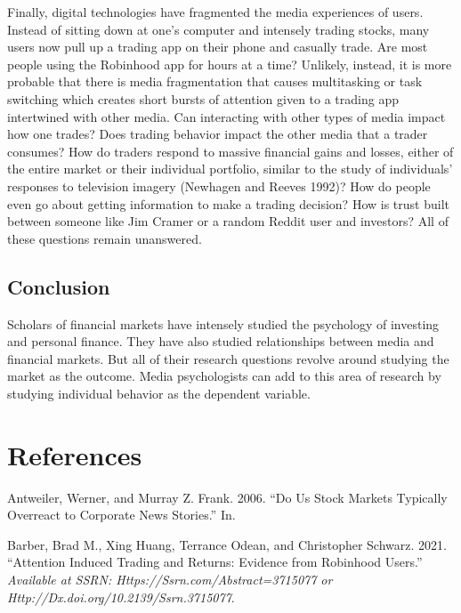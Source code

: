 \documentclass[12pt,]{article}
\begin{document}
Finally, digital technologies have fragmented the media experiences of
users. Instead of sitting down at one's computer and intensely trading
stocks, many users now pull up a trading app on their phone and casually
trade. Are most people using the Robinhood app for hours at a time?
Unlikely, instead, it is more probable that there is media fragmentation
that causes multitasking or task switching which creates short bursts of
attention given to a trading app intertwined with other media. Can
interacting with other types of media impact how one trades? Does
trading behavior impact the other media that a trader consumes? How do
traders respond to massive financial gains and losses, either of the
entire market or their individual portfolio, similar to the study of
individuals' responses to television imagery (Newhagen and Reeves 1992)?
How do people even go about getting information to make a trading
decision? How is trust built between someone like Jim Cramer or a random
Reddit user and investors? All of these questions remain unanswered.

\hypertarget{conclusion}{%
\subsection{Conclusion}\label{conclusion}}

Scholars of financial markets have intensely studied the psychology of
investing and personal finance. They have also studied relationships
between media and financial markets. But all of their research questions
revolve around studying the market as the outcome. Media psychologists
can add to this area of research by studying individual behavior as the
dependent variable.

\hypertarget{references}{%
\section*{References}\label{references}}

\hypertarget{refs}{}
\leavevmode\hypertarget{ref-antweiler2006}{}%
Antweiler, Werner, and Murray Z. Frank. 2006. ``Do Us Stock Markets
Typically Overreact to Corporate News Stories.'' In.

\leavevmode\hypertarget{ref-barber2021}{}%
Barber, Brad M., Xing Huang, Terrance Odean, and Christopher Schwarz.
2021. ``Attention Induced Trading and Returns: Evidence from Robinhood
Users.'' \emph{Available at SSRN: Https://Ssrn.com/Abstract=3715077 or
Http://Dx.doi.org/10.2139/Ssrn.3715077}.
\end{document}
